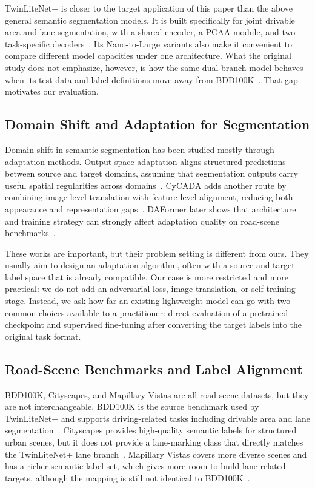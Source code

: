 \documentclass[conference]{IEEEtran}
\begin{document}
TwinLiteNet+ is closer to the target application of this paper than the above general semantic segmentation models. It is built specifically for joint drivable area and lane segmentation, with a shared encoder, a PCAA module, and two task-specific decoders~\cite{ref1}. Its Nano-to-Large variants also make it convenient to compare different model capacities under one architecture. What the original study does not emphasize, however, is how the same dual-branch model behaves when its test data and label definitions move away from BDD100K~\cite{ref1,ref2}. That gap motivates our evaluation.

\subsection{Domain Shift and Adaptation for Segmentation}
Domain shift in semantic segmentation has been studied mostly through adaptation methods. Output-space adaptation aligns structured predictions between source and target domains, assuming that segmentation outputs carry useful spatial regularities across domains~\cite{ref8}. CyCADA adds another route by combining image-level translation with feature-level alignment, reducing both appearance and representation gaps~\cite{ref9}. DAFormer later shows that architecture and training strategy can strongly affect adaptation quality on road-scene benchmarks~\cite{ref10}.

These works are important, but their problem setting is different from ours. They usually aim to design an adaptation algorithm, often with a source and target label space that is already compatible. Our case is more restricted and more practical: we do not add an adversarial loss, image translation, or self-training stage. Instead, we ask how far an existing lightweight model can go with two common choices available to a practitioner: direct evaluation of a pretrained checkpoint and supervised fine-tuning after converting the target labels into the original task format.

\subsection{Road-Scene Benchmarks and Label Alignment}
BDD100K, Cityscapes, and Mapillary Vistas are all road-scene datasets, but they are not interchangeable. BDD100K is the source benchmark used by TwinLiteNet+ and supports driving-related tasks including drivable area and lane segmentation~\cite{ref1,ref2}. Cityscapes provides high-quality semantic labels for structured urban scenes, but it does not provide a lane-marking class that directly matches the TwinLiteNet+ lane branch~\cite{ref3}. Mapillary Vistas covers more diverse scenes and has a richer semantic label set, which gives more room to build lane-related targets, although the mapping is still not identical to BDD100K~\cite{ref4}.
\end{document}
